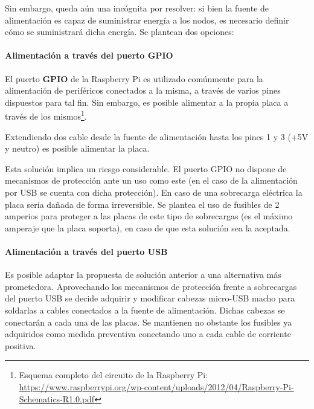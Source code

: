 Sin embargo, queda aún una incógnita por resolver: si bien la fuente de alimentación es capaz de suministrar energía a los nodos, es necesario definir cómo se suministrará dicha energía. Se plantean dos opciones:

\paragraph{Alimentación a través del puerto GPIO\\}

El puerto \textbf{GPIO} de la Raspberry Pi es utilizado comúnmente para la alimentación de periféricos conectados a la misma, a través de varios pines dispuestos para tal fin. Sin embargo, es posible alimentar a la propia placa a través de los mismos\footnote{Esquema completo del circuito de la Raspberry Pi: \href{https://www.raspberrypi.org/wp-content/uploads/2012/04/Raspberry-Pi-Schematics-R1.0.pdf}{https://www.raspberrypi.org/wp-content/uploads/2012/04/Raspberry-Pi-Schematics-R1.0.pdf}}.%

Extendiendo dos cable desde la fuente de alimentación hasta los pines 1 y 3 (+5V y neutro) es posible alimentar la placa.

Esta solución implica un riesgo considerable. El puerto GPIO no dispone de mecanismos de protección ante un uso como este (en el caso de la alimentación por USB se cuenta con dicha protección). En caso de una sobrecarga eléctrica la placa sería dañada de forma irreversible. Se plantea el uso de fusibles de 2 amperios para proteger a las placas de este tipo de sobrecargas (es el máximo amperaje que la placa soporta), en caso de que esta solución sea la aceptada.

\paragraph{Alimentación a través del puerto USB\\}

Es posible adaptar la propuesta de solución anterior a una alternativa más prometedora. Aprovechando los mecanismos de protección frente a sobrecargas del puerto USB se decide adquirir y modificar cabezas micro-USB macho para soldarlas a cables conectados a la fuente de alimentación. Dichas cabezas se conectarán a cada una de las placas. Se mantienen no obstante los fusibles ya adquiridos como medida preventiva conectando uno a cada cable de corriente positiva.

